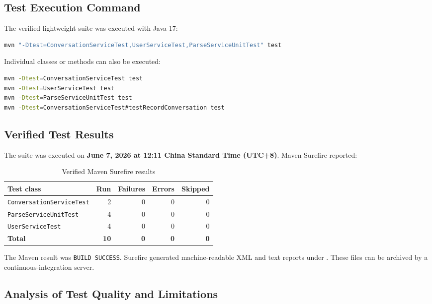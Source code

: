 \documentclass[11pt,a4paper]{article}
\begin{document}
\subsection{Test Execution Command}

The verified lightweight suite was executed with Java 17:
\begin{lstlisting}[language=bash]
mvn "-Dtest=ConversationServiceTest,UserServiceTest,ParseServiceUnitTest" test
\end{lstlisting}

Individual classes or methods can also be executed:
\begin{lstlisting}[language=bash]
mvn -Dtest=ConversationServiceTest test
mvn -Dtest=UserServiceTest test
mvn -Dtest=ParseServiceUnitTest test
mvn -Dtest=ConversationServiceTest#testRecordConversation test
\end{lstlisting}

\subsection{Verified Test Results}

The suite was executed on \textbf{June 7, 2026 at 12:11 China Standard Time
(UTC+8)}. Maven Surefire reported:

\begin{table}[htbp]
\centering
\caption{Verified Maven Surefire results}
\begin{tabular}{@{}lrrrr@{}}
\toprule
\textbf{Test class} & \textbf{Run} & \textbf{Failures} & \textbf{Errors} & \textbf{Skipped} \\
\midrule
\texttt{ConversationServiceTest} & 2 & 0 & 0 & 0 \\
\texttt{ParseServiceUnitTest} & 4 & 0 & 0 & 0 \\
\texttt{UserServiceTest} & 4 & 0 & 0 & 0 \\
\midrule
\textbf{Total} & \textbf{10} & \textbf{0} & \textbf{0} & \textbf{0} \\
\bottomrule
\end{tabular}
\end{table}

The Maven result was \texttt{BUILD SUCCESS}. Surefire generated machine-readable XML
and text reports under . These files can be archived by
a continuous-integration server.

\subsection{Analysis of Test Quality and Limitations}
\end{document}
